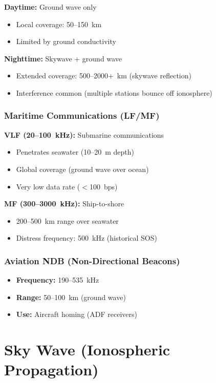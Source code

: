 \textbf{Daytime:} Ground wave only
\begin{itemize}
\item Local coverage: 50--150~km
\item Limited by ground conductivity
\end{itemize}

\textbf{Nighttime:} Skywave + ground wave
\begin{itemize}
\item Extended coverage: 500--2000+~km (skywave reflection)
\item Interference common (multiple stations bounce off ionosphere)
\end{itemize}

\subsubsection{Maritime Communications (LF/MF)}

\textbf{VLF (20--100~kHz):} Submarine communications
\begin{itemize}
\item Penetrates seawater (10--20~m depth)
\item Global coverage (ground wave over ocean)
\item Very low data rate ($<$100~bps)
\end{itemize}

\textbf{MF (300--3000~kHz):} Ship-to-shore
\begin{itemize}
\item 200--500~km range over seawater
\item Distress frequency: 500~kHz (historical SOS)
\end{itemize}

\subsubsection{Aviation NDB (Non-Directional Beacons)}

\begin{itemize}
\item \textbf{Frequency:} 190--535~kHz
\item \textbf{Range:} 50--100~km (ground wave)
\item \textbf{Use:} Aircraft homing (ADF receivers)
\end{itemize}

\section{Sky Wave (Ionospheric Propagation)}
\label{sec:sky-wave}

